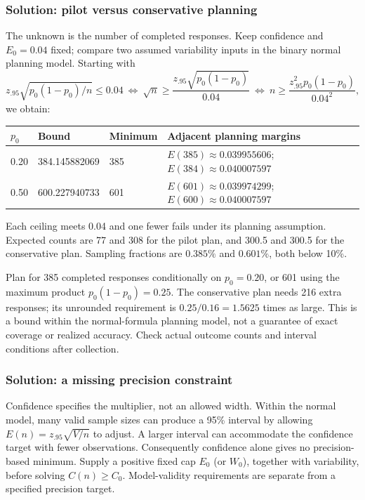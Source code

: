 \subsubsection*{Solution: pilot versus conservative planning}\label{sol:advanced-pilot}
The unknown is the number of completed responses. Keep confidence and $E_0=0.04$ fixed; compare two assumed variability inputs in the binary normal planning model. Starting with
\[
z_{.95}\sqrt{p_0(1-p_0)/n}\le0.04
\ \Longleftrightarrow\ \sqrt n\ge\frac{z_{.95}\sqrt{p_0(1-p_0)}}{0.04}
\ \Longleftrightarrow\ n\ge\frac{z_{.95}^2p_0(1-p_0)}{0.04^2},
\]
we obtain:
\begin{center}\begin{tabular}{@{}llll@{}}\toprule
$p_0$ & Bound & Minimum & Adjacent planning margins\\\midrule
0.20 & 384.145882069 & 385 & $E(385)\approx0.039955606$; $E(384)\approx0.040007597$\\
0.50 & 600.227940733 & 601 & $E(601)\approx0.039974299$; $E(600)\approx0.040007597$\\\bottomrule
\end{tabular}\end{center}
Each ceiling meets 0.04 and one fewer fails under its planning assumption. Expected counts are 77 and 308 for the pilot plan, and 300.5 and 300.5 for the conservative plan. Sampling fractions are $0.385\%$ and $0.601\%$, both below 10\%.

Plan for 385 completed responses conditionally on $p_0=0.20$, or 601 using the maximum product $p_0(1-p_0)=0.25$. The conservative plan needs 216 extra responses; its unrounded requirement is $0.25/0.16=1.5625$ times as large. This is a bound within the normal-formula planning model, not a guarantee of exact coverage or realized accuracy. Check actual outcome counts and interval conditions after collection.
\subsubsection*{Solution: a missing precision constraint}\label{sol:advanced-missing}
Confidence specifies the multiplier, not an allowed width. Within the normal model, many valid sample sizes can produce a 95\% interval by allowing $E(n)=z_{.95}\sqrt{V/n}$ to adjust. A larger interval can accommodate the confidence target with fewer observations. Consequently confidence alone gives no precision-based minimum. Supply a positive fixed cap $E_0$ (or $W_0$), together with variability, before solving $C(n)\ge C_0$. Model-validity requirements are separate from a specified precision target.


